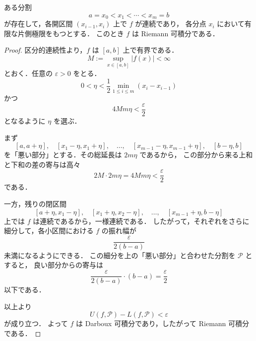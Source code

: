 
\begin{example}[区分的に連続な関数]
ある分割
\[
a=x_0<x_1<\cdots<x_m=b
\]
が存在して，各開区間 $(x_{i-1},x_i)$ 上で $f$ が連続であり，
各分点 $x_i$ において有限な片側極限をもつとする．
このとき $f$ は Riemann 可積分である．
\end{example}

\begin{proof}
区分的連続性より，$f$ は $[a,b]$ 上で有界である．
\[
M:=\sup_{x\in[a,b]}|f(x)|<\infty
\]
とおく．任意の $\varepsilon>0$ をとる．
\[
0<\eta<\frac12\min_{1\le i\le m}(x_i-x_{i-1})
\]
かつ
\[
4Mm\eta<\frac{\varepsilon}{2}
\]
となるように $\eta$ を選ぶ．

まず
\[
[a,a+\eta],\quad
[x_1-\eta,x_1+\eta],\quad \dots,\quad
[x_{m-1}-\eta,x_{m-1}+\eta],\quad
[b-\eta,b]
\]
を「悪い部分」とする．その総延長は $2m\eta$ であるから，
この部分から来る上和と下和の差の寄与は高々
\[
2M\cdot 2m\eta=4Mm\eta<\frac{\varepsilon}{2}
\]
である．

一方，残りの閉区間
\[
[a+\eta,x_1-\eta],\quad
[x_1+\eta,x_2-\eta],\quad \dots,\quad
[x_{m-1}+\eta,b-\eta]
\]
上では $f$ は連続であるから，一様連続である．
したがって，それぞれをさらに細分して，各小区間における $f$ の振れ幅が
\[
\frac{\varepsilon}{2(b-a)}
\]
未満になるようにできる．
この細分を上の「悪い部分」と合わせた分割を $\mathcal P$ とすると，
良い部分からの寄与は
\[
\frac{\varepsilon}{2(b-a)}\cdot (b-a)=\frac{\varepsilon}{2}
\]
以下である．

以上より
\[
U(f,\mathcal P)-L(f,\mathcal P)<\varepsilon
\]
が成り立つ．
よって $f$ は Darboux 可積分であり，したがって Riemann 可積分である．
\end{proof}


